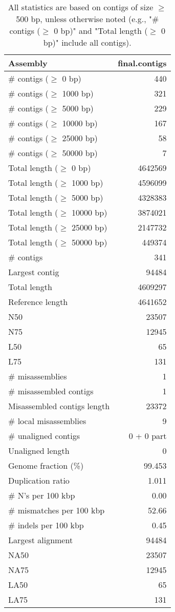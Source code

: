 \documentclass[12pt,a4paper]{article}
\begin{document}
\begin{table}[ht]
\begin{center}
\caption{All statistics are based on contigs of size $\geq$ 500 bp, unless otherwise noted (e.g., "\# contigs ($\geq$ 0 bp)" and "Total length ($\geq$ 0 bp)" include all contigs).}
\begin{tabular}{|l*{1}{|r}|}
\hline
Assembly & final.contigs \\ \hline
\# contigs ($\geq$ 0 bp) & 440 \\ \hline
\# contigs ($\geq$ 1000 bp) & 321 \\ \hline
\# contigs ($\geq$ 5000 bp) & 229 \\ \hline
\# contigs ($\geq$ 10000 bp) & 167 \\ \hline
\# contigs ($\geq$ 25000 bp) & 58 \\ \hline
\# contigs ($\geq$ 50000 bp) & 7 \\ \hline
Total length ($\geq$ 0 bp) & 4642569 \\ \hline
Total length ($\geq$ 1000 bp) & 4596099 \\ \hline
Total length ($\geq$ 5000 bp) & 4328383 \\ \hline
Total length ($\geq$ 10000 bp) & 3874021 \\ \hline
Total length ($\geq$ 25000 bp) & 2147732 \\ \hline
Total length ($\geq$ 50000 bp) & 449374 \\ \hline
\# contigs & 341 \\ \hline
Largest contig & 94484 \\ \hline
Total length & 4609297 \\ \hline
Reference length & 4641652 \\ \hline
N50 & 23507 \\ \hline
N75 & 12945 \\ \hline
L50 & 65 \\ \hline
L75 & 131 \\ \hline
\# misassemblies & 1 \\ \hline
\# misassembled contigs & 1 \\ \hline
Misassembled contigs length & 23372 \\ \hline
\# local misassemblies & 9 \\ \hline
\# unaligned contigs & 0 + 0 part \\ \hline
Unaligned length & 0 \\ \hline
Genome fraction (\%) & 99.453 \\ \hline
Duplication ratio & 1.011 \\ \hline
\# N's per 100 kbp & 0.00 \\ \hline
\# mismatches per 100 kbp & 52.66 \\ \hline
\# indels per 100 kbp & 0.45 \\ \hline
Largest alignment & 94484 \\ \hline
NA50 & 23507 \\ \hline
NA75 & 12945 \\ \hline
LA50 & 65 \\ \hline
LA75 & 131 \\ \hline
\end{tabular}
\end{center}
\end{table}
\end{document}
